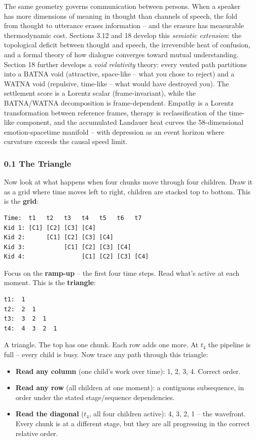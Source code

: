 \documentclass[
  11pt,
]{article}
\begin{document}
The same geometry governs communication between persons. When a speaker
has more dimensions of meaning in thought than channels of speech, the
fold from thought to utterance erases information -- and the erasure has
measurable thermodynamic cost. Sections 3.12 and 18 develop this
\emph{semiotic extension}: the topological deficit between thought and
speech, the irreversible heat of confusion, and a formal theory of how
dialogue converges toward mutual understanding. Section 18 further
develops a \emph{void relativity} theory: every vented path partitions
into a BATNA void (attractive, space-like -- what you chose to reject)
and a WATNA void (repulsive, time-like -- what would have destroyed
you). The settlement score is a Lorentz scalar (frame-invariant), while
the BATNA/WATNA decomposition is frame-dependent. Empathy is a Lorentz
transformation between reference frames, therapy is reclassification of
the time-like component, and the accumulated Landauer heat curves the
58-dimensional emotion-spacetime manifold -- with depression as an event
horizon where curvature exceeds the causal speed limit.

\subsubsection{0.1 The Triangle}\label{the-triangle}

Now look at what happens when four chunks move through four children.
Draw it as a grid where time moves left to right, children are stacked
top to bottom. This is the \textbf{grid}:

\begin{verbatim}
Time:  t1   t2   t3   t4   t5   t6   t7
Kid 1: [C1] [C2] [C3] [C4]
Kid 2:      [C1] [C2] [C3] [C4]
Kid 3:           [C1] [C2] [C3] [C4]
Kid 4:                [C1] [C2] [C3] [C4]
\end{verbatim}

Focus on the \textbf{ramp-up} -- the first four time steps. Read what's
active at each moment. This is the \textbf{triangle}:

\begin{verbatim}
t1:  1
t2:  2  1
t3:  3  2  1
t4:  4  3  2  1
\end{verbatim}

A triangle. The top has one chunk. Each row adds one more. At \(t_4\)
the pipeline is full -- every child is busy. Now trace any path through
this triangle:

\begin{itemize}
\item
  \textbf{Read any column} (one child's work over time): 1, 2, 3, 4.
  Correct order.
\item
  \textbf{Read any row} (all children at one moment): a contiguous
  subsequence, in order under the stated stage/sequence dependencies.
\item
  \textbf{Read the diagonal} (\(t_4\), all four children active): 4, 3,
  2, 1 -- the wavefront. Every chunk is at a different stage, but they
  are all progressing in the correct relative order.
\end{itemize}
\end{document}
